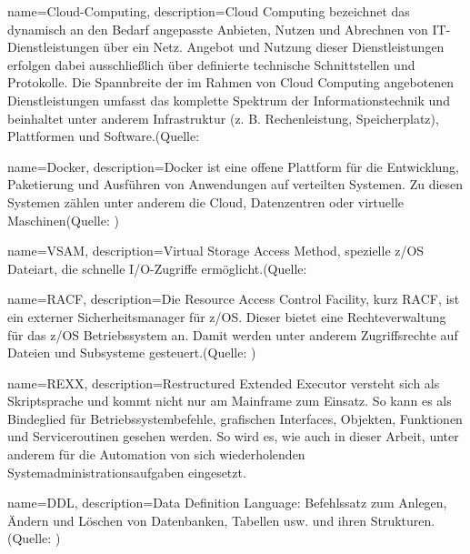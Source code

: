 {
	name=Cloud-Computing,
	description={\glqq Cloud Computing bezeichnet das dynamisch an den Bedarf angepasste Anbieten, Nutzen und Abrechnen von IT-Dienstleistungen über ein Netz. Angebot und Nutzung dieser Dienstleistungen erfolgen dabei ausschließlich über definierte technische Schnittstellen und Protokolle. Die Spannbreite der im Rahmen von Cloud Computing angebotenen Dienstleistungen umfasst das komplette Spektrum der Informationstechnik und beinhaltet unter anderem Infrastruktur (z. B. Rechenleistung, Speicherplatz), Plattformen und Software.\grqq(Quelle: \cite{.23.2.2020b}}
}

{
	name=Docker,
	description={Docker ist eine offene Plattform für die Entwicklung, Paketierung und Ausführen von Anwendungen auf verteilten Systemen. Zu diesen Systemen zählen unter anderem die Cloud, Datenzentren oder virtuelle Maschinen(Quelle: \cite{Vohra.2016})}
}

{
	name=VSAM,
	description={Virtual Storage Access Method, spezielle z/OS Dateiart, die schnelle I/O-Zugriffe ermöglicht.(Quelle: \cite[S. 2-4]{Lovelace.2013}}
}

{
	name=RACF,
	description={Die Resource Access Control Facility, kurz RACF, ist ein externer Sicherheitsmanager für z/OS.
Dieser bietet eine Rechteverwaltung für das z/OS Betriebssystem an.
Damit werden unter anderem Zugriffsrechte auf Dateien und Subsysteme gesteuert.(Quelle: \cite[S. 18-21]{Karan.2008})}
}

{
	name=REXX,
	description={Restructured Extended Executor versteht sich als Skriptsprache und kommt nicht nur am Mainframe zum Einsatz.
So kann es als Bindeglied für Betriebssystembefehle, grafischen Interfaces, Objekten, Funktionen und Serviceroutinen gesehen werden.
So wird es, wie auch in dieser Arbeit, unter anderem für die Automation von sich wiederholenden Systemadministrationsaufgaben eingesetzt.
\cite[S. 3-4]{Fosdick.2005}}
}

{
	name=DDL,
	description={Data Definition Language: Befehlssatz zum Anlegen, Ändern und Löschen von
Datenbanken, Tabellen usw. und ihren Strukturen.(Quelle: \cite[S. 61]{Adams.2016})}
}